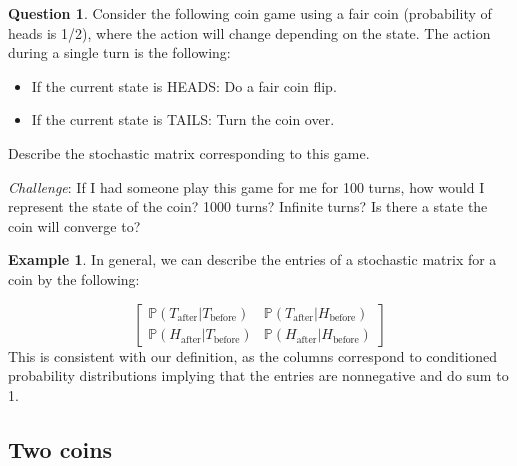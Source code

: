 \documentclass[letterpaper, 12pt]{article}
\newcommand{\pr}{\mathbb{P}}	%
\newcommand{\1}{\mathds{1}}	%
\theoremstyle{definition}
\newtheorem{example}[theorem]{Example}
\newtheorem{question}{Question}
\begin{document}
\begin{question}
    Consider the following coin game using a fair coin (probability of heads is 1/2), where the action will change depending on the state. The action during a single turn is the following:
    \begin{itemize}
        \item If the current state is HEADS: Do a fair coin flip. 
        \item If the current state is TAILS: Turn the coin over. 
    \end{itemize}
    Describe the stochastic matrix corresponding to this game. 

    \textit{Challenge}: If I had someone play this game for me for 100 turns, how would I represent the state of the coin? 1000 turns? Infinite turns? Is there a state the coin will converge to? 
\end{question}
\vspace{35mm} %

\newpage 
\begin{example}
    In general, we can describe the entries of a stochastic matrix for a coin by the following: 

    \begin{equation}\begin{bmatrix}
        \pr (T_{\text{after}}|T_{\text{before}}) & \pr (T_{\text{after}}|H_{\text{before}}) \\ 
        \pr (H_{\text{after}}|T_{\text{before}}) & \pr (H_{\text{after}}|H_{\text{before}})
    \end{bmatrix}
    \end{equation}
    This is consistent with our definition, as the columns correspond to conditioned probability distributions implying that the entries are nonnegative and do sum to 1. 
\end{example}

\subsection{Two coins}
\end{document}
